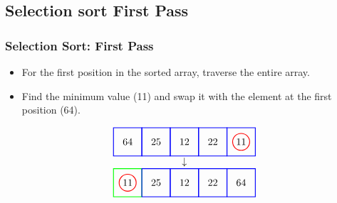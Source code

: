 \documentclass{beamer}
\begin{document}
\subsection{Selection sort First Pass}
\begin{frame}[c, fragile]
\frametitle{Selection Sort: First Pass}

\begin{itemize}
    \item For the first position in the sorted array, traverse the entire array.
    \item Find the minimum value (11) and swap it with the element at the first position (64).
\end{itemize}

\[
\begin{array}{c}
\begin{tikzpicture}[baseline=(current bounding box.center)]
    \node at (0,0) {64};
    \node at (1,0) {25};
    \node at (2,0) {12};
    \node at (3,0) {22};
    \node at (4,0) {11};
    \draw[red, thick] (4,0) circle (0.3);
    \draw[blue, thick] (-0.5,-0.5) rectangle (0.5,0.5);
    \draw[blue, thick] (0.5,-0.5) rectangle (1.5,0.5);
    \draw[blue, thick] (1.5,-0.5) rectangle (2.5,0.5);
    \draw[blue, thick] (2.5,-0.5) rectangle (3.5,0.5);
    \draw[blue, thick] (3.5,-0.5) rectangle (4.5,0.5);
\end{tikzpicture} \\
\downarrow \\
\begin{tikzpicture}[baseline=(current bounding box.center)]
    \node at (0,0) {11};
    \node at (1,0) {25};
    \node at (2,0) {12};
    \node at (3,0) {22};
    \node at (4,0) {64};
    \draw[red, thick] (0,0) circle (0.3);
    \draw[green, thick] (-0.5,-0.5) rectangle (0.5,0.5);
    \draw[blue, thick] (0.5,-0.5) rectangle (1.5,0.5);
    \draw[blue, thick] (1.5,-0.5) rectangle (2.5,0.5);
    \draw[blue, thick] (2.5,-0.5) rectangle (3.5,0.5);
    \draw[blue, thick] (3.5,-0.5) rectangle (4.5,0.5);
\end{tikzpicture}
\end{array}
\]

\end{frame}
\end{document}
